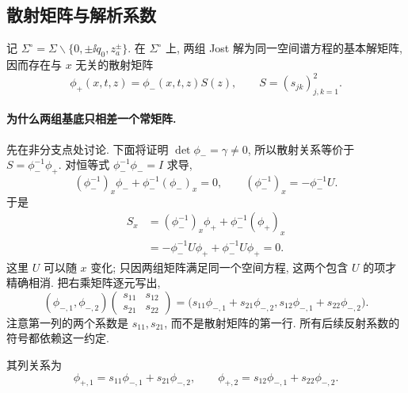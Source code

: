 \subsection{散射矩阵与解析系数}
记 $\Sigma^\circ=\Sigma\mathbin{\backslash}\{0,\pm\ii q_0,z_a^\pm\}$. 在 $\Sigma^\circ$ 上, 两组 Jost 解为同一空间谱方程的基本解矩阵, 因而存在与 $x$ 无关的散射矩阵
\begin{equation}\label{eq:Sdef}
\phi_+(x,t,z)=\phi_-(x,t,z)S(z),\qquad S=(s_{jk})_{j,k=1}^{2}.
\end{equation}

\paragraph{为什么两组基底只相差一个常矩阵.}
先在非分支点处讨论. 下面将证明 $\det\phi_-=\gamma\ne0$,
所以散射关系等价于 $S=\phi_-^{-1}\phi_+$.
对恒等式 $\phi_-^{-1}\phi_-=I$ 求导,
\[
(\phi_-^{-1})_x\phi_-+\phi_-^{-1}(\phi_-)_x=0,
\qquad
(\phi_-^{-1})_x=-\phi_-^{-1}U.
\]
于是
\begin{align*}
S_x
&=(\phi_-^{-1})_x\phi_++\phi_-^{-1}(\phi_+)_x\\
&=-\phi_-^{-1}U\phi_++\phi_-^{-1}U\phi_+=0.
\end{align*}
这里 $U$ 可以随 $x$ 变化; 只因两组矩阵满足同一个空间方程,
这两个包含 $U$ 的项才精确相消.
把右乘矩阵逐元写出,
\[
(\phi_{-,1},\phi_{-,2})
\begin{pmatrix}s_{11}&s_{12}\\s_{21}&s_{22}\end{pmatrix}
=\bigl(s_{11}\phi_{-,1}+s_{21}\phi_{-,2},
 s_{12}\phi_{-,1}+s_{22}\phi_{-,2}\bigr).
\]
注意第一列的两个系数是 $s_{11},s_{21}$,
而不是散射矩阵的第一行. 所有后续反射系数的符号都依赖这一约定.

其列关系为
\begin{equation}\label{eq:scattering-columns}
\phi_{+,1}=s_{11}\phi_{-,1}+s_{21}\phi_{-,2},\qquad
\phi_{+,2}=s_{12}\phi_{-,1}+s_{22}\phi_{-,2}.
\end{equation}

